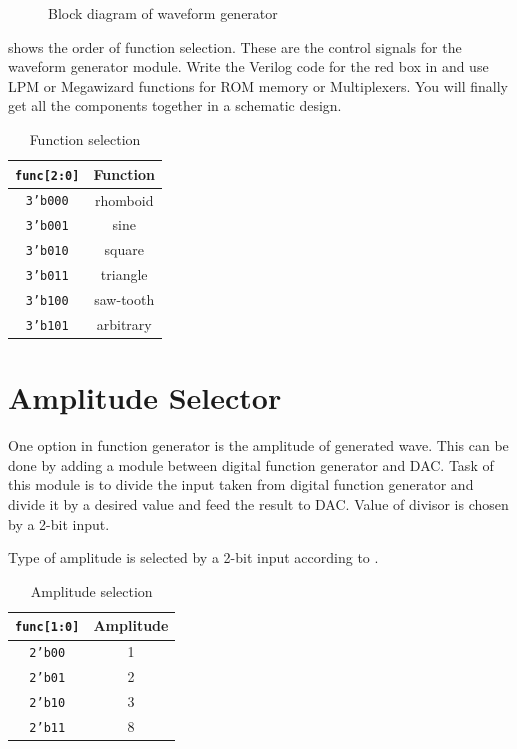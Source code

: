 \documentclass[12pt, logo=tehranDLDL/ut]{tehranDLDL}
\begin{document}
\begin{figure}
    \centering
    \caption{Block diagram of waveform generator\label{fig:WGblockdia}}
    \resizebox{0.9\textwidth}{!}{}
\end{figure}

 shows the order of function selection. These are the control signals for the waveform generator module.
Write the Verilog code for the red box in  and use LPM or Megawizard functions for ROM memory or Multiplexers.
You will finally get all the components together in a schematic design.

\begin{table}[t]
    \centering
    \caption{Function selection\label{tab:funcsel}}
    \begin{tabular}{c c}
        \texttt{func[2:0]} & Function\\
        \hline
        \texttt{3'b000} & rhomboid\\
        \texttt{3'b001} & sine\\
        \texttt{3'b010} & square\\
        \texttt{3'b011} & triangle\\
        \texttt{3'b100} & saw-tooth\\
        \texttt{3'b101} & arbitrary
    \end{tabular}
\end{table}

\designverification{}

\section{Amplitude Selector}

One option in function generator is the amplitude of generated wave. This can be done by adding a module between digital function generator and DAC. Task of this module is to divide the input taken from digital function generator and divide it by a desired value and feed the result to DAC. Value of divisor is chosen by a 2-bit input.

Type of amplitude is selected by a 2-bit input according to .

\begin{table}[b]
    \centering
    \caption{Amplitude selection\label{tab:ampsel}}
    \begin{tabular}{c c}
        \texttt{func[1:0]} & Amplitude\\
        \hline
        \texttt{2'b00} & 1\\
        \texttt{2'b01} & 2\\
        \texttt{2'b10} & 3\\
        \texttt{2'b11} & 8
    \end{tabular}
\end{table}
\end{document}
